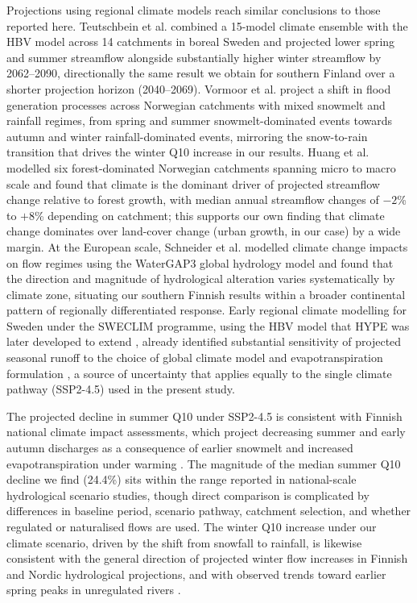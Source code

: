 \documentclass[draft]{agujournal2019}
\begin{document}
Projections using regional climate models reach similar conclusions to those reported here. Teutschbein et al.  combined a 15-model climate ensemble with the HBV model across 14 catchments in boreal Sweden and projected lower spring and summer streamflow alongside substantially higher winter streamflow by 2062--2090, directionally the same result we obtain for southern Finland over a shorter projection horizon (2040--2069). Vormoor et al.  project a shift in flood generation processes across Norwegian catchments with mixed snowmelt and rainfall regimes, from spring and summer snowmelt-dominated events towards autumn and winter rainfall-dominated events, mirroring the snow-to-rain transition that drives the winter Q10 increase in our results. Huang et al.  modelled six forest-dominated Norwegian catchments spanning micro to macro scale and found that climate is the dominant driver of projected streamflow change relative to forest growth, with median annual streamflow changes of $-2$\% to $+8$\% depending on catchment; this supports our own finding that climate change dominates over land-cover change (urban growth, in our case) by a wide margin. At the European scale, Schneider et al.  modelled climate change impacts on flow regimes using the WaterGAP3 global hydrology model and found that the direction and magnitude of hydrological alteration varies systematically by climate zone, situating our southern Finnish results within a broader continental pattern of regionally differentiated response. Early regional climate modelling for Sweden under the SWECLIM programme, using the HBV model that HYPE was later developed to extend \cite{Lindstrom2010}, already identified substantial sensitivity of projected seasonal runoff to the choice of global climate model and evapotranspiration formulation \cite{Bergstrom2001}, a source of uncertainty that applies equally to the single climate pathway (SSP2-4.5) used in the present study.

The projected decline in summer Q10 under SSP2-4.5 is consistent with Finnish national climate impact assessments, which project decreasing summer and early autumn discharges as a consequence of earlier snowmelt and increased evapotranspiration under warming \cite{ruosteenoja2021projected}. The magnitude of the median summer Q10 decline we find (24.4\%) sits within the range reported in national-scale hydrological scenario studies, though direct comparison is complicated by differences in baseline period, scenario pathway, catchment selection, and whether regulated or naturalised flows are used. The winter Q10 increase under our climate scenario, driven by the shift from snowfall to rainfall, is likewise consistent with the general direction of projected winter flow increases in Finnish and Nordic hydrological projections, and with observed trends toward earlier spring peaks in unregulated rivers \cite{lintunen2024changes}.
\end{document}
